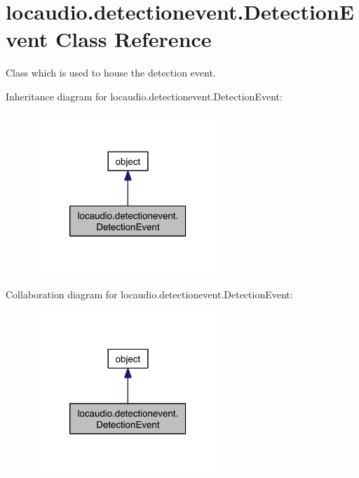 \hypertarget{classlocaudio_1_1detectionevent_1_1DetectionEvent}{\section{locaudio.\-detectionevent.\-Detection\-Event Class Reference}
\label{classlocaudio_1_1detectionevent_1_1DetectionEvent}
}


Class which is used to house the detection event.  




Inheritance diagram for locaudio.\-detectionevent.\-Detection\-Event\-:
\nopagebreak
\begin{figure}[H]
\begin{center}
\leavevmode
\includegraphics[width=202pt]{classlocaudio_1_1detectionevent_1_1DetectionEvent__inherit__graph}
\end{center}
\end{figure}


Collaboration diagram for locaudio.\-detectionevent.\-Detection\-Event\-:
\nopagebreak
\begin{figure}[H]
\begin{center}
\leavevmode
\includegraphics[width=202pt]{classlocaudio_1_1detectionevent_1_1DetectionEvent__coll__graph}
\end{center}
\end{figure}
